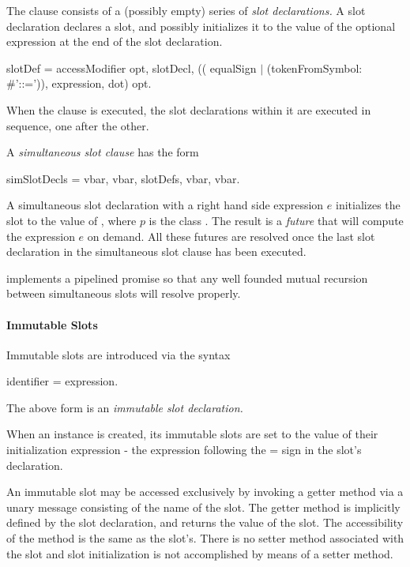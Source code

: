\documentclass{article}
\begin{document}
The clause consists of a (possibly empty) series of {\em slot declarations.}  A slot declaration declares a slot, and possibly initializes it to the value of the optional expression at the end of the slot declaration.
\begin{newspeak}
slotDef =  accessModifier opt, slotDecl, 
     (( equalSign $|$ (tokenFromSymbol: \#'::=')), expression, dot) opt.
\end{newspeak}


When the clause is executed, the slot declarations within it are executed in sequence, one after the other.

A {\em simultaneous slot  clause} has the form 
\begin{newspeak}
simSlotDecls = vbar, vbar, slotDefs, vbar, vbar.
\end{newspeak}
 
A simultaneous slot declaration with a right hand side expression $e$ initializes the slot to the value of  , where $p$ is the class . The result is a {\em future} that will compute the expression $e$ on demand.   All these futures are resolved once the last slot declaration in the simultaneous slot  clause has been executed.

 implements a pipelined promise so that any well founded mutual recursion between simultaneous slots will resolve properly.


 

\paragraph{Immutable Slots}
\label{immutableSlots}

Immutable slots are introduced via the syntax
\begin{newspeak}
identifier = expression.
\end{newspeak}

The above form is an {\em immutable slot declaration.}

When an instance is created, its immutable slots are set to the value of their initialization expression - the expression following the = sign in the slot's declaration.

An immutable slot may be accessed exclusively by invoking a getter method via a unary message consisting of the name of the slot. The getter method is implicitly defined by the slot declaration, and returns the value of the slot. The accessibility of the method is the same as the slot's. There is no setter method associated with the slot and slot initialization is not accomplished by means of a setter method.
\end{document}
